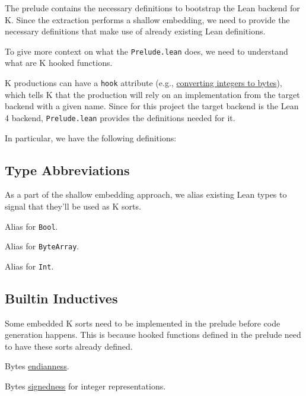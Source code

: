 The prelude contains the necessary definitions to bootstrap the Lean backend for
K. Since the extraction performs a shallow embedding, we need to provide the
necessary definitions that make use of already existing Lean definitions.

To give more context on what the \texttt{Prelude.lean} does, we need to
understand what are K hooked functions.

K productions can have a \texttt{hook} attribute (e.g., \href{https://github.com/runtimeverification/k/blob/master/k-distribution/include/kframework/builtin/domains.md#integer-and-bytes-conversion}{converting integers
  to bytes}), which tells K that the production will rely on an implementation
from the target backend with a given name. Since for this project the target
backend is the Lean 4 backend, \texttt{Prelude.lean} provides the definitions
needed for it.

In particular, we have the following definitions:

\subsection{Type Abbreviations}

As a part of the shallow embedding approach, we alias existing Lean types to
signal that they'll be used as K sorts.

\begin{definition}[SortBool]\label{def:SortBool}\leanok
Alias for \texttt{Bool}.
\end{definition}
\begin{definition}[SortBytes]\label{def:SortBytes}\leanok
Alias for \texttt{ByteArray}.
\end{definition}
\begin{definition}[SortInt]\label{def:SortInt}\leanok
Alias for \texttt{Int}.
\end{definition}

\subsection{Builtin Inductives}

Some embedded K sorts need to be implemented in the prelude before code
generation happens. This is because hooked functions defined in the prelude need
to have these sorts already defined.

\begin{definition}[SortEndianness]\label{def:SortEndianness}\leanok
Bytes \href{https://en.wikipedia.org/wiki/Endianness}{endianness}.
\end{definition}
\begin{definition}[SortSignedness]\label{def:SortSignedness}\leanok
Bytes
\href{https://en.wikipedia.org/wiki/Signed_number_representations}{signedness}
for integer representations.
\end{definition}

